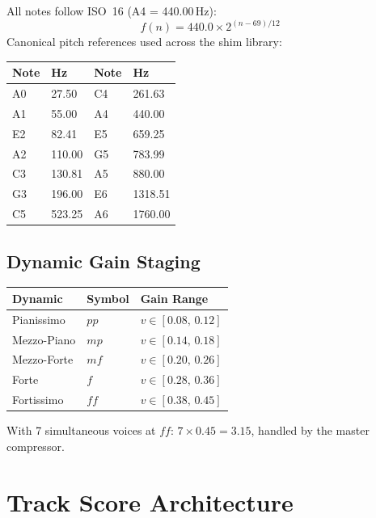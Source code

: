 \documentclass[10pt,journal,compsoc,twocolumn]{article}
\begin{document}
All notes follow ISO~16 (A4 = 440.00\,Hz):
\begin{equation}
f(n) = 440.0 \times 2^{(n-69)/12}
\label{eq:et}
\end{equation}
Canonical pitch references used across the shim library:

\begin{center}
\scriptsize
\begin{tabular}{@{}llll@{}}
\toprule
Note & Hz & Note & Hz \\
\midrule
A0  & 27.50  & C4  & 261.63 \\
A1  & 55.00  & A4  & 440.00 \\
E2  & 82.41  & E5  & 659.25 \\
A2  & 110.00 & G5  & 783.99 \\
C3  & 130.81 & A5  & 880.00 \\
G3  & 196.00 & E6  & 1318.51 \\
C5  & 523.25 & A6  & 1760.00 \\
\bottomrule
\end{tabular}
\end{center}

\subsection{Dynamic Gain Staging}

\begin{center}
\scriptsize
\begin{tabular}{@{}lll@{}}
\toprule
Dynamic & Symbol & Gain Range \\
\midrule
Pianissimo  & $pp$ & $v\in[0.08,\,0.12]$ \\
Mezzo-Piano & $mp$ & $v\in[0.14,\,0.18]$ \\
Mezzo-Forte & $mf$ & $v\in[0.20,\,0.26]$ \\
Forte       & $f$  & $v\in[0.28,\,0.36]$ \\
Fortissimo  & $ff$ & $v\in[0.38,\,0.45]$ \\
\bottomrule
\end{tabular}
\end{center}

With 7 simultaneous voices at $ff$: $7\times 0.45=3.15$, handled by the
master compressor.

\section{Track Score Architecture}
\label{sec:tracks}
\end{document}

